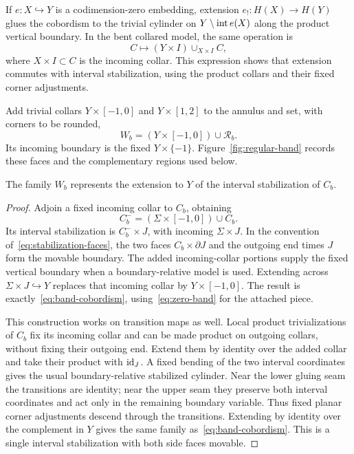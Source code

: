 If $e:X\hookrightarrow Y$ is a codimension-zero embedding, extension
$e_!:H(X)\to H(Y)$ glues the cobordism to the trivial cylinder on
$Y\setminus\operatorname{int} e(X)$ along the product vertical boundary. In the bent
collared model, the same operation is
\begin{equation}\label{eq:hcob-extension}
 C\longmapsto(Y\times I)\cup_{X\times I}C,
\end{equation}
where $X\times I\subset C$ is the incoming collar. This expression shows
that extension commutes with interval stabilization, using the product
collars and their fixed corner adjustments.

Add trivial collars $Y\times[-1,0]$ and $Y\times[1,2]$ to the annulus and set, with corners to be rounded,
\begin{equation}\label{eq:band-cobordism}
 W_b=(Y\times[-1,0])\cup\mathcal R_b.
\end{equation}
Its incoming boundary is the fixed $Y\times\{-1\}$.
Figure~\ref{fig:regular-band} records these faces and the complementary
regions used below.


\begin{lemma}\label{lem:band-is-stabilization}
The family $W_b$ represents the extension to $Y$ of the interval stabilization of $C_b$.
\end{lemma}

\begin{proof}
Adjoin a fixed incoming collar to $C_b$, obtaining
\[
 C_b^-=(\Sigma\times[-1,0])\cup C_b.
\]
Its interval stabilization is $C_b^-\times J$, with incoming $\Sigma\times J$. In the convention of~\eqref{eq:stabilization-faces}, the two faces $C_b\times\partial J$ and the outgoing end times $J$ form the movable boundary. The added incoming-collar portions supply the fixed vertical boundary when a boundary-relative model is used. Extending across $\Sigma\times J\hookrightarrow Y$ replaces that incoming collar by $Y\times[-1,0]$. The result is exactly~\eqref{eq:band-cobordism}, using~\eqref{eq:zero-band} for the attached piece.

This construction works on transition maps as well. Local product trivializations of $C_b$ fix its incoming collar and can be made product on outgoing collars, without fixing their outgoing end. Extend them by identity over the added collar and take their product with $\operatorname{id}_J$. A fixed bending of the two interval coordinates gives the usual boundary-relative stabilized cylinder. Near the lower gluing seam the transitions are identity; near the upper seam they preserve both interval coordinates and act only in the remaining boundary variable. Thus fixed planar corner adjustments descend through the transitions. Extending by identity over the complement in $Y$ gives the same family as~\eqref{eq:band-cobordism}. This is a single interval stabilization with both side faces movable.
\end{proof}


